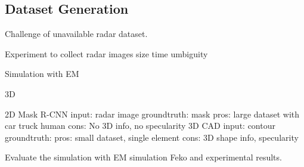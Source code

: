 \subsection{Dataset Generation}


Challenge of unavailable radar dataset.

Experiment to collect radar images size time umbiguity

Simulation with EM 



3D %

2D
	Mask R-CNN
		input: radar image
		groundtruth: mask
	pros: large dataset with car truck human 
	cons: No 3D info, no specularity
	3D CAD
		input: contour
		groundtruth:
	pros: small dataset, single element 
	cons: 3D shape info, specularity 


Evaluate the simulation with EM simulation Feko and experimental results.

